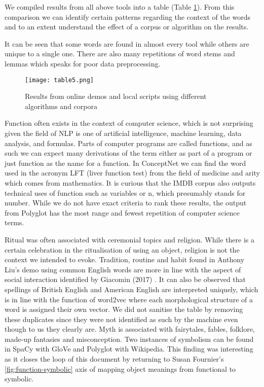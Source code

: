 \documentclass[12pt, usenames, dvipsnames]{report}
\begin{document}
\begin{flushleft}
We compiled results from all above tools into a table (Table \ref{fig:table5}).
From this comparison we can identify certain patterns regarding the context of the words and to an extent understand the effect of a corpus or algorithm on the results.

It can be seen that some words are found in almost every tool while others are unique to a single one.
There are also many repetitions of word stems and lemmas which speaks for poor data preprocessing.

\vspace*{1.2em}
\begin{figure}[!htbp]
  \hspace*{-3.666em}
  \texttt{[image: table5.png]}
  \caption{Results from online demos and local scripts using different algorithms and corpora}
  \label{fig:table5}
\end{figure}
\vspace*{1.2em}

Function often exists in the context of computer science, which is not surprising given the field of NLP is one of artificial intelligence, machine learning, data analysis, and formulas.
Parts of computer programs are called functions, and as such we can expect many derivations of the term either as part of a program or just function as the name for a function.
In ConceptNet we can find the word used in the acronym LFT (liver function test) from the field of medicine and arity which comes from mathematics.
It is curious that the IMDB corpus also outputs technical uses of function such as variables or n, which presumably stands for number.
While we do not have exact criteria to rank these results, the output from Polyglot has the most range and fewest repetition of computer science terms.

Ritual was often associated with ceremonial topics and religion.
While there is a certain celebration in the ritualisation of using an object, religion is not the context we intended to evoke.
Tradition, routine and habit found in Anthony Liu’s demo using common English words are more in line with the aspect of social interaction identified by Giacomin (2017) \cite{giacomin2017}.
It can also be observed that spellings of British English and American English are interpreted uniquely, which is in line with the function of word2vec where each morphological structure of a word is assigned their own vector.
We did not sanitise the table by removing these duplicates since they were not identified as such by the machine even though to us they clearly are.
Myth is associated with fairytales, fables, folklore, made-up fantasies and misconception.
Two instances of symbolism can be found in SpaCy with GloVe and Polyglot with Wikipedia.
This finding was interesting as it closes the loop of this document by returning to Susan Fournier’s \ref{fig:function-symbolic} axis of mapping object meanings from functional to symbolic.


\end{flushleft}
\end{document}
